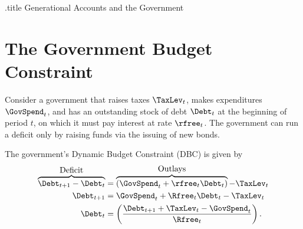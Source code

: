 \documentclass{handout}
\begin{document}
\handoutHeader


\begin{verbatimwrite}{\jobname.title}
Generational Accounts and the Government
\end{verbatimwrite}

\handoutNameMake


\section{The Government Budget Constraint}

Consider a government that raises taxes $\TaxLev_{t}$, makes expenditures 
$\GovSpend_{t}$, and has an outstanding stock of debt $\Debt_{t}$ at the beginning 
of period $t$, on which it must pay interest at rate $\rfree_{t}$.  The 
government can run a deficit only by raising funds via the issuing of 
new bonds.

The government's Dynamic Budget Constraint (DBC) is given by 
\begin{equation}\begin{gathered}\begin{aligned}
        \overbrace{\Debt_{t+1}-\Debt_{t}}^{\mbox{Deficit}} & =  \overbrace{(\GovSpend_{t}+\rfree_{t}\Debt_{t})}^{\mbox{Outlays}}-\TaxLev_{t} %
\\ \Debt_{t+1} & =  \GovSpend_{t}+\Rfree_{t}\Debt_{t}-\TaxLev_{t}
\\ \Debt_{t} & =  \left(\frac{\Debt_{t+1}+\TaxLev_{t}-\GovSpend_{t}}{\Rfree_{t}}\right)   \label{eq:recurse}
.
\end{aligned}\end{gathered}\end{equation}
\end{document}
